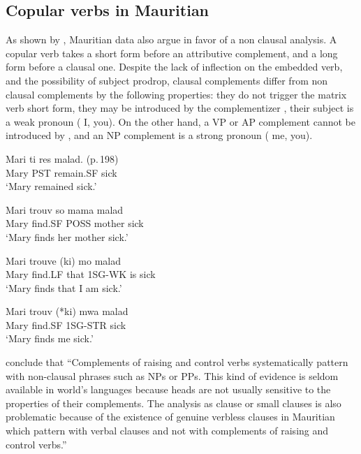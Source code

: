 \documentclass[output=paper]{langsci/langscibook}
\begin{document}
\subsection{Copular verbs in Mauritian}

As shown by \citet{HenriandLaurens2011}, Mauritian data also argue in favor of a non clausal analysis. A copular verb takes a short form before an attributive complement, and a long form before a clausal one. Despite the lack of inflection on the embedded verb, and the possibility of subject prodrop,  clausal complements differ from non clausal complements by the following properties: they do not trigger the matrix verb short form, they may be introduced by the complementizer , their subject is a weak pronoun ( I, you). On the other hand, a VP or AP complement cannot be introduced by , and an NP complement is a strong pronoun ( me, you).

\begin{exe}
\ex \begin{xlist}
\ex \gll Mari ti res  malad. (p.\,198)\\
Mary PST remain.SF sick\\
\glt `Mary remained sick.'

\ex \gll Mari trouv  so mama malad\\
Mary find.SF POSS mother sick\\
\glt `Mary finds her mother sick.'

\ex \gll Mari trouve (ki) mo malad\\
Mary find.LF that 1SG-WK is sick\\
\glt `Mary finds that I am sick.'

\ex \gll Mari trouv (*ki) mwa malad\\
Mary find.SF 1SG-STR sick\\
\glt `Mary finds me sick.'
\end{xlist}
\end{exe}

\citet[]{HenriandLaurens2011} conclude that ``Complements of raising and control verbs systematically pattern with non-clausal phrases such as NPs or PPs. This kind of evidence is seldom available in world’s languages because heads are not usually sensitive to the properties of their complements. The analysis as clause or small clauses is also problematic because of the existence of genuine verbless clauses in Mauritian which pattern with verbal clauses and not with complements of raising and control verbs.''
\end{document}
